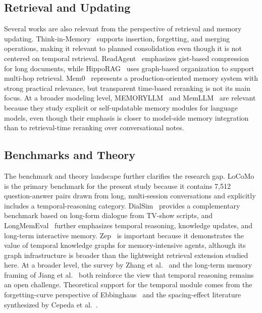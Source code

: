 \documentclass[conference]{IEEEtran}
\begin{document}
\subsection{Retrieval and Updating}

Several works are also relevant from the perspective of retrieval and memory updating. Think-in-Memory~\cite{liu2023tim} supports insertion, forgetting, and merging operations, making it relevant to planned consolidation even though it is not centered on temporal retrieval. ReadAgent~\cite{lee2024readagent} emphasizes gist-based compression for long documents, while HippoRAG~\cite{gutierrez2024hipporag} uses graph-based organization to support multi-hop retrieval. Mem0~\cite{chhikara2025mem0} represents a production-oriented memory system with strong practical relevance, but transparent time-based reranking is not its main focus. At a broader modeling level, MEMORYLLM~\cite{wang2024memoryllm} and MemLLM~\cite{modarressi2024memllm} are relevant because they study explicit or self-updatable memory modules for language models, even though their emphasis is closer to model-side memory integration than to retrieval-time reranking over conversational notes.

\subsection{Benchmarks and Theory}

The benchmark and theory landscape further clarifies the research gap. LoCoMo~\cite{maharana2024locomo} is the primary benchmark for the present study because it contains 7,512 question-answer pairs drawn from long, multi-session conversations and explicitly includes a temporal-reasoning category. DialSim~\cite{kim2024dialsim} provides a complementary benchmark based on long-form dialogue from TV-show scripts, and LongMemEval~\cite{wu2025longmemeval} further emphasizes temporal reasoning, knowledge updates, and long-term interactive memory. Zep~\cite{rasmussen2025zep} is important because it demonstrates the value of temporal knowledge graphs for memory-intensive agents, although its graph infrastructure is broader than the lightweight retrieval extension studied here. At a broader level, the survey by Zhang et al.~\cite{zhang2024survey} and the long-term memory framing of Jiang et al.~\cite{jiang2024ltm} both reinforce the view that temporal reasoning remains an open challenge. Theoretical support for the temporal module comes from the forgetting-curve perspective of Ebbinghaus~\cite{ebbinghaus1885} and the spacing-effect literature synthesized by Cepeda et al.~\cite{cepeda2006}.
\end{document}
